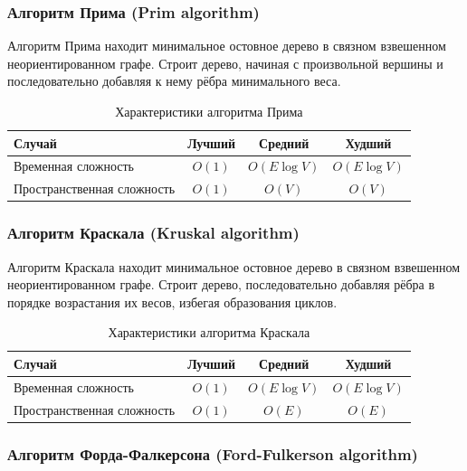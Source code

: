 \documentclass[a4paper,12pt]{article}
\begin{document}
\subsubsection{Алгоритм Прима (Prim algorithm)}
\label{subsubsec:алгоритм-прима-prim-algorithm}

Алгоритм Прима находит минимальное остовное дерево в связном взвешенном неориентированном графе. Строит дерево, начиная с произвольной вершины и последовательно добавляя к нему рёбра минимального веса.

\begin{table}[H]
    \centering
    \begin{tabular}{|l|c|c|c|}
        \hline
        Случай & Лучший & Средний & Худший \\
        \hline
        Временная сложность & $O(1)$ & $O(E \log V)$ & $O(E \log V)$ \\
        \hline
        Пространственная сложность & $O(1)$ & $O(V)$ & $O(V)$ \\
        \hline
    \end{tabular}
    \caption{Характеристики алгоритма Прима}
\end{table}

\subsubsection{Алгоритм Краскала (Kruskal algorithm)}
\label{subsubsec:алгоритм-краскала-kruskal-algorithm}

Алгоритм Краскала находит минимальное остовное дерево в связном взвешенном неориентированном графе. Строит дерево, последовательно добавляя рёбра в порядке возрастания их весов, избегая образования циклов.

\begin{table}[H]
    \centering
    \begin{tabular}{|l|c|c|c|}
        \hline
        Случай & Лучший & Средний & Худший \\
        \hline
        Временная сложность & $O(1)$ & $O(E \log V)$ & $O(E \log V)$ \\
        \hline
        Пространственная сложность & $O(1)$ & $O(E)$ & $O(E)$ \\
        \hline
    \end{tabular}
    \caption{Характеристики алгоритма Краскала}
\end{table}

\subsubsection{Алгоритм Форда-Фалкерсона (Ford-Fulkerson algorithm)}
\label{subsubsec:алгоритм-форда-фалкерсона-ford-fulkerson-algorithm}
\end{document}
